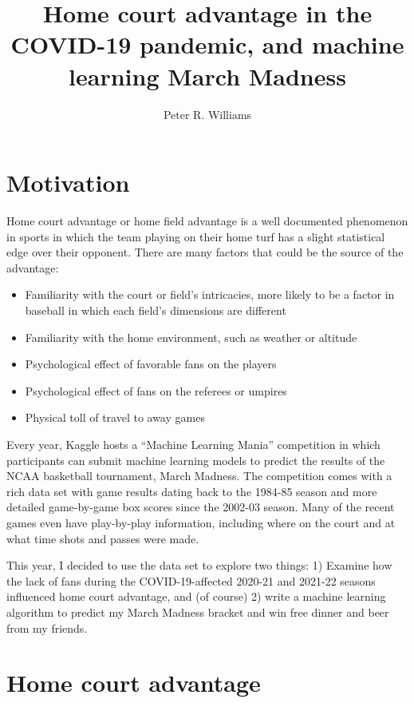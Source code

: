 \documentclass[twocolumn]{aastex63}
\begin{document}
\title{Home court advantage in the COVID-19 pandemic, and machine learning March Madness}

\author[0000-0002-4645-6578]{Peter R. Williams}


\section{Motivation}
\label{sect:intro}
Home court advantage or home field advantage is a well documented phenomenon in sports in which the team playing on their home turf has a slight statistical edge over their opponent.
There are many factors that could be the source of the advantage:
\begin{itemize}
\item Familiarity with the court or field's intricacies, more likely to be a factor in baseball in which each field's dimensions are different
\item Familiarity with the home environment, such as weather or altitude
\item Psychological effect of favorable fans on the players
\item Psychological effect of fans on the referees or umpires
\item Physical toll of travel to away games
\end{itemize}

Every year, Kaggle hosts a ``Machine Learning Mania'' competition in which participants can submit machine learning models to predict the results of the NCAA basketball tournament, March Madness.
The competition comes with a rich data set with game results dating back to the 1984-85 season and more detailed game-by-game box scores since the 2002-03 season.
Many of the recent games even have play-by-play information, including where on the court and at what time shots and passes were made.

This year, I decided to use the data set to explore two things: 1) Examine how the lack of fans during the COVID-19-affected 2020-21 and 2021-22 seasons influenced home court advantage, and (of course) 2) write a machine learning algorithm to predict my March Madness bracket and win free dinner and beer from my friends.

\section{Home court advantage}
\label{sect:homecourt}
\end{document}
